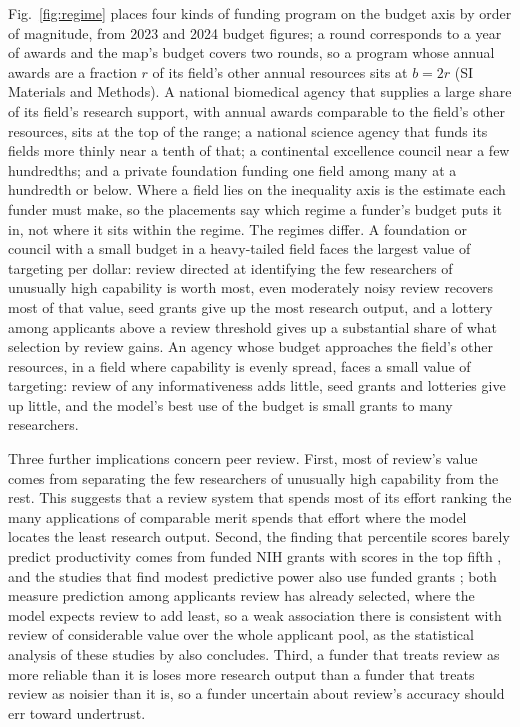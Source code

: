 \documentclass[article, 11pt, reqno]{amsart}
\theoremstyle{named}
\begin{document}
Fig.~\ref{fig:regime} places four kinds of funding program on the budget axis by order of magnitude, from 2023 and 2024 budget figures; a round corresponds to a year of awards and the map's budget covers two rounds, so a program whose annual awards are a fraction $r$ of its field's other annual resources sits at $b = 2r$ (SI Materials and Methods). A national biomedical agency that supplies a large share of its field's research support, with annual awards comparable to the field's other resources, sits at the top of the range; a national science agency that funds its fields more thinly near a tenth of that; a continental excellence council near a few hundredths; and a private foundation funding one field among many at a hundredth or below. Where a field lies on the inequality axis is the estimate each funder must make, so the placements say which regime a funder's budget puts it in, not where it sits within the regime. The regimes differ. A foundation or council with a small budget in a heavy-tailed field faces the largest value of targeting per dollar: review directed at identifying the few researchers of unusually high capability is worth most, even moderately noisy review recovers most of that value, seed grants give up the most research output, and a lottery among applicants above a review threshold gives up a substantial share of what selection by review gains. An agency whose budget approaches the field's other resources, in a field where capability is evenly spread, faces a small value of targeting: review of any informativeness adds little, seed grants and lotteries give up little, and the model's best use of the budget is small grants to many researchers.



Three further implications concern peer review. First, most of review's value comes from separating the few researchers of unusually high capability from the rest. This suggests that a review system that spends most of its effort ranking the many applications of comparable merit spends that effort where the model locates the least research output. Second, the finding that percentile scores barely predict productivity comes from funded NIH grants with scores in the top fifth \citep{Fang2016}, and the studies that find modest predictive power also use funded grants \citep{LiAgha2015}; both measure prediction among applicants review has already selected, where the model expects review to add least, so a weak association there is consistent with review of considerable value over the whole applicant pool, as the statistical analysis of these studies by \citet{LindnerNakamura2015} also concludes. Third, a funder that treats review as more reliable than it is loses more research output than a funder that treats review as noisier than it is, so a funder uncertain about review's accuracy should err toward undertrust.
\end{document}
